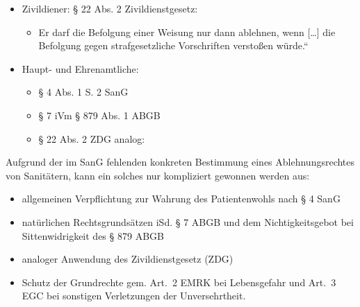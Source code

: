 \begin{itemize}
    \item {\mdseries
    Zivildiener: {\S} 22 Abs. 2 Zivildienstgesetz:}
    
    
    \begin{itemize}
        \item
        {\quotedblbase}Er darf die Befolgung einer Weisung nur dann ablehnen,
        wenn [{\dots}] die Befolgung gegen strafgesetzliche Vorschriften
        versto{\ss}en w\"urde.{\textquotedblleft}
        
    \end{itemize}
    
    \item {\mdseries
    Haupt- und Ehrenamtliche: }
    
    \begin{itemize}
        \item {\mdseries
        {\S} 4 Abs. 1 S. 2 SanG}
        
        \item {\mdseries
        {\S} 7 iVm {\S} 879 Abs. 1 ABGB}
        
        \item {\mdseries
        {\S} 22 Abs. 2 ZDG analog:}
        
    \end{itemize}
    
\end{itemize}

Aufgrund der im SanG fehlenden konkreten Bestimmung eines
Ablehnungsrechtes von Sanitätern, kann ein solches nur kompliziert
gewonnen werden aus:

\begin{itemize}
    \item allgemeinen Verpflichtung zur Wahrung des Patientenwohls nach {\S} 4
    SanG    
    \item nat\"urlichen Rechtsgrundsätzen iSd. {\S} 7 ABGB und dem
    Nichtigkeitsgebot bei Sittenwidrigkeit des {\S} 879 ABGB    
    \item analoger Anwendung des Zivildienstgesetz (ZDG) 
    \item Schutz der Grundrechte gem. Art.~2 EMRK bei
    Lebensgefahr und Art.~3 EGC bei sonstigen Verletzungen
    der Unversehrtheit.    
\end{itemize}




